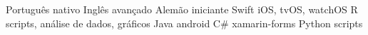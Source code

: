 \begin{cvskills}
  \cvskill
    {Português}
    {nativo}
  \cvskill
    {Inglês}
    {avançado}
  \cvskill
    {Alemão}
    {iniciante}
  \cvskill
    {Swift}
    {iOS, tvOS, watchOS}
    \cvskill
    {R}
    {scripts, análise de dados, gráficos}
  \cvskill
    {Java}
    {android}
  \cvskill
    {C\#}
    {xamarin-forms}
  \cvskill
    {Python}
    {scripts}
\end{cvskills}
